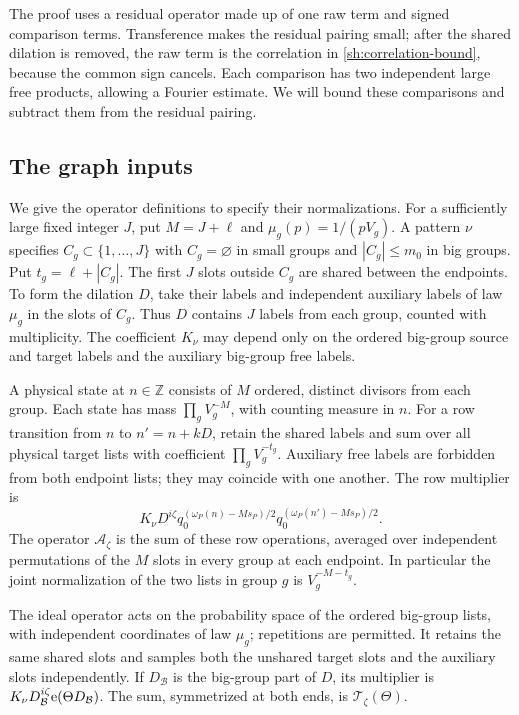 The proof uses a residual operator made up of one raw term and signed
comparison terms. Transference makes the residual pairing small; after
the shared dilation is removed, the raw term is the correlation in
\eqref{sh:correlation-bound}, because the common sign cancels.
Each comparison has two independent large free products, allowing a
Fourier estimate. We will bound these comparisons and subtract them
from the residual pairing.

\subsection{The graph inputs}

We give the operator definitions to specify their normalizations.
For a sufficiently large fixed integer $J$, put $M=J+\ell$ and
$\mu_g(p)=1/(pV_g)$.  A pattern $\nu$ specifies
$C_g\subset\{1,\ldots,J\}$ with $C_g=\varnothing$ in small groups
and $|C_g|\leq m_0$ in big groups.  Put $t_g=\ell+|C_g|$.
The first $J$ slots outside $C_g$ are shared between the endpoints.
To form the dilation $D$, take their labels and independent auxiliary
labels of law $\mu_g$ in the slots of $C_g$.  Thus $D$ contains $J$
labels from each group, counted with multiplicity.
The coefficient $K_\nu$ may depend only on the ordered big-group
source and target labels and the auxiliary big-group free labels.

A physical state at $n\in\mathbb Z$ consists of $M$ ordered,
distinct divisors from each group.  Each state has mass
$\prod_gV_g^{-M}$, with counting measure in $n$.  For a row
transition from $n$ to $n'=n+kD$, retain the shared labels and sum
over all physical target lists with coefficient $\prod_gV_g^{-t_g}$.
Auxiliary free labels are forbidden from both endpoint lists; they
may coincide with one another.  The row multiplier is
\begin{equation}\label{sh:physical-multiplier}
 K_\nu D^{i\zeta}
 q_0^{(\omega_P(n)-Ms_P)/2}q_0^{(\omega_P(n')-Ms_P)/2}.
\end{equation}
The operator $\mathcal A_\zeta$ is the sum of these row operations,
averaged over independent permutations of the $M$ slots in every
group at each endpoint.  In particular the joint normalization of
the two lists in group $g$ is $V_g^{-M-t_g}$.

The ideal operator acts on the probability space of the ordered
big-group lists, with independent coordinates of law $\mu_g$;
repetitions are permitted.  It retains the same shared slots and
samples both the unshared target slots and the auxiliary slots
independently.  If $D_{\mathcal B}$ is the big-group part of $D$,
its multiplier is
$K_\nu D_{\mathcal B}^{i\zeta}\mathrm{e}(\Theta D_{\mathcal B})$.
The sum, symmetrized at both ends, is $\mathcal T_\zeta(\Theta)$.


